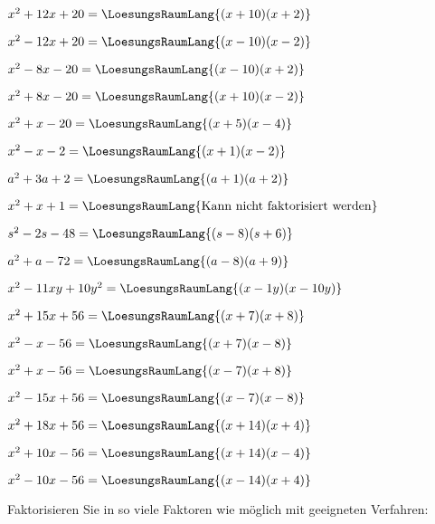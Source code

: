 \begin{bbwAufgabenBlock}
\item $x^2 + 12x + 20 = \LoesungsRaumLang{(x+10)(x+2)}$
\item $x^2 - 12x + 20 = \LoesungsRaumLang{(x-10)(x-2)}$
\item $x^2 - 8x - 20 = \LoesungsRaumLang{(x-10)(x+2)}$
\item $x^2 + 8x - 20 = \LoesungsRaumLang{(x+10)(x-2)}$\noTRAINER{\newpage}
\item $x^2 + x - 20 = \LoesungsRaumLang{(x+5)(x-4)}$

\item $x^2 - x - 2 = \LoesungsRaumLang{(x+1)(x-2)}$
\item $a^2+3a+2 = \LoesungsRaumLang{(a+1)(a+2)}$
\item $x^2 + x + 1 = \LoesungsRaumLang{\textrm{Kann nicht faktorisiert werden}}$\noTRAINER{\newpage}
\item $s^2 -2s - 48 = \LoesungsRaumLang{(s-8)(s+6)}$
\item $a^2 + a - 72 = \LoesungsRaumLang{(a-8)(a+9)}$
\item $x^2 - 11xy + 10y^2 = \LoesungsRaumLang{(x-1y)(x-10y)}$\noTRAINER{\newpage}

\item $x^2 + 15 x + 56 = \LoesungsRaumLang{(x+7)(x+8)}$
\item $x^2 -    x - 56 = \LoesungsRaumLang{(x+7)(x-8)}$
\item $x^2 +    x - 56 = \LoesungsRaumLang{(x-7)(x+8)}$
\item $x^2 - 15 x + 56 = \LoesungsRaumLang{(x-7)(x-8)}$\noTRAINER{\newpage}

\item $x^2 + 18x + 56 = \LoesungsRaumLang{(x+14)(x+4)}$
\item $x^2 + 10x - 56 = \LoesungsRaumLang{(x+14)(x-4)}$
\item $x^2 - 10x - 56 = \LoesungsRaumLang{(x-14)(x+4)}$

\end{bbwAufgabenBlock}

\newpage


Faktorisieren Sie in so viele Faktoren wie möglich
mit geeigneten Verfahren:


